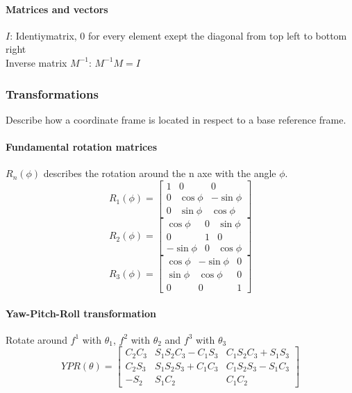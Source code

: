 \documentclass{article}
\begin{document}
	\paragraph{Matrices and vectors}
	$I$: Identiymatrix, 0 for every element exept the diagonal from top left to bottom right\\
	Inverse matrix $M^{-1}$: $M^{-1} M = I$
	
	\subsubsection{Transformations}
	Describe how a coordinate frame is located in respect to a base reference frame.
	\paragraph{Fundamental rotation matrices} $R_{n}(\phi)$ describes the rotation around the n axe with the angle $\phi$.\\
	\begin{equation}
	R_{1}(\phi) = 
	\begin{bmatrix}
	1 & 0 & 0\\
	0 & \cos \phi & -\sin \phi\\
	0 & \sin \phi & \cos \phi
	\end{bmatrix}
	\end{equation}
	\begin{equation}
	R_{2}(\phi) = 
	\begin{bmatrix}
	\cos \phi & 0 & \sin \phi\\
	0 & 1 & 0\\
	-\sin \phi & 0 & \cos \phi
	\end{bmatrix}
	\end{equation}
	\begin{equation}
	R_{3}(\phi) = 
	\begin{bmatrix}
	\cos \phi & -\sin \phi & 0\\
	\sin \phi & \cos \phi & 0\\
	0 & 0 & 1
	\end{bmatrix}
	\end{equation}
	
	\paragraph{Yaw-Pitch-Roll transformation} Rotate around $f^1$ with $\theta_{1}$, $f^2$ with $\theta_{2}$ and $f^3$ with $\theta_{3}$
	\begin{equation}
	YPR(\theta) = 
	\begin{bmatrix}
	C_{2} C_{3} & S_{1} S_{2} C_{3} - C_{1} S_{3} & C_{1} S_{2} C_{3} + S_{1} S_{3}\\
	C_{2} S_{3}  & S_{1} S_{2} S_{3} + C_{1} C_{3} & C_{1} S_{2} S_{3} - S_{1} C_{3}\\
	-S_{2} & S_{1} C_{2} & C_{1} C_{2}
	\end{bmatrix}
	\end{equation}
	
\end{document}
